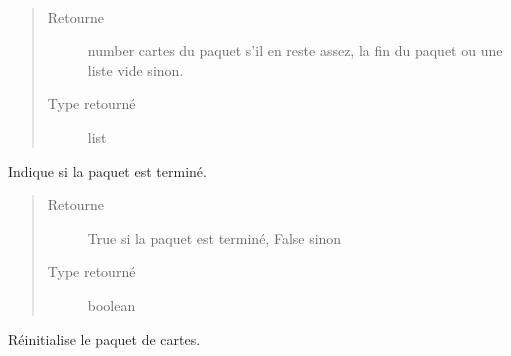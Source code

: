 \documentclass[letterpaper,10pt,french]{sphinxmanual}
\begin{document}
\begin{fulllineitems}

\begin{fulllineitems}
\label{\detokenize{doc_classe:cards.Deck.draw}}~\begin{quote}\begin{description}
\item[{Retourne}] \leavevmode
number cartes du paquet s’il en reste assez, la fin du
paquet ou une liste vide sinon.

\item[{Type retourné}] \leavevmode
list

\end{description}\end{quote}

\end{fulllineitems}


\begin{fulllineitems}
\label{\detokenize{doc_classe:cards.Deck.is_finished}}
Indique si la paquet est terminé.
\begin{quote}\begin{description}
\item[{Retourne}] \leavevmode
True si la paquet est terminé, False sinon

\item[{Type retourné}] \leavevmode
boolean

\end{description}\end{quote}

\end{fulllineitems}


\begin{fulllineitems}
\label{\detokenize{doc_classe:cards.Deck.reset}}
Réinitialise le paquet de cartes.

\end{fulllineitems}


\end{fulllineitems}

\end{document}
